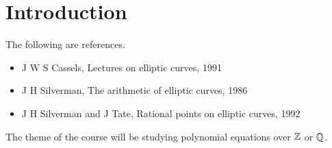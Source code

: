 \def\module{M4P32 Number Theory: Elliptic Curves}
\def\lecturer{Prof Toby Gee}
\def\term{Autumn 2018}
\def\cover{
$$
\begin{tikzpicture}[scale=2]
\draw [domain=-2:0] plot (\x, {sqrt(\x*(\x - 1)*(\x + 2))});
\draw [domain=-2:0] plot (\x, {-sqrt(\x*(\x - 1)*(\x + 2))});
\draw [domain=1:2] plot (\x, {sqrt(\x*(\x - 1)*(\x + 2))});
\draw [domain=1:2] plot (\x, {-sqrt(\x*(\x - 1)*(\x + 2))});
\fill (0, 0) circle (0.05) node[below left]{$ \OO $};
\fill (-0.25, 0.7) circle (0.05) node[above]{$ P $};
\fill (-2, 0) circle (0.05) node[below left]{$ Q $};
\draw [dashed, domain=-3:3] plot (\x, {0.4*(\x + 2)});
\fill (1.4, 1.35) circle (0.05) node[below right]{$ -\br{P + Q} $};
\draw [dashed, domain=-3:3] plot (\x, \x);
\fill (-1.4, -1.4) circle (0.05) node[below right]{$ P + Q $};
\fill (-0.4, -0.95) circle (0.05) node[below]{$ R $};
\draw [dashed, domain=-3:3] plot (\x, {-0.6*(\x + 2)});
\fill (1.75, -2.25) circle (0.05) node[above right]{$ -\br{Q + R} $};
\draw [dashed, domain=-2.5:2.5] plot (\x, {-1.3*\x});
\fill (-1.1, 1.45) circle (0.05) node[above right]{$ Q + R $};
\draw [dashed, domain=-3:3] plot (\x, {-0.8*\x + 0.55});
\draw [dashed, domain=-3:3] plot (\x, {0.45*\x - 0.75});
\fill (1.05, -0.3) circle (0.05) node[right]{$ S $};
\draw [dashed, domain=-3:3] plot (\x, {-0.3*\x});
\fill (-1.95, 0.55) circle (0.05) node[below left]{$ T $};
\draw (0, -2.5) node {$ T = -S = P + \br{Q + R} = \br{P + Q} + R $};
\end{tikzpicture}
$$
}
\def\syllabus{The $ p $-adic numbers. Basic algebraic geometry. Plane conics. The Hasse principle. Plane cubics. Torsion in $ E\br{\Q} $. Elliptic curves over $ \Q_p $. Rank of $ E\br{\Q} $. The Mordell-Weil theorem.}
\def\thm{section}







\section{Introduction}


The following are references.
\begin{itemize}
\item J W S Cassels, Lectures on elliptic curves, 1991
\item J H Silverman, The arithmetic of elliptic curves, 1986
\item J H Silverman and J Tate, Rational points on elliptic curves, 1992
\end{itemize}
The theme of the course will be studying polynomial equations over $ \mathbb{Z} $ or $ \mathbb{Q} $.

